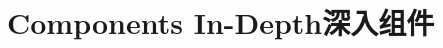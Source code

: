 \documentclass[oneside]{book}
\begin{document}
% 
% 
% 
% 
% 
% 
% 
% 
% 
% 
% 
%  
%  

\chapter{Components In-Depth\hfill 深入组件}
%  
%  
%  
% 
% 
% 

\end{document}
